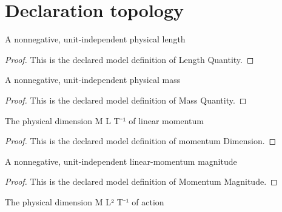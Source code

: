 \section{Declaration topology}
\begin{definition}
  \label{def:physics:phyx-mini-0557:phyxminiproblems-problemphyxmini0557-lengthquantity}
  A nonnegative, unit-independent physical length
\end{definition}
\begin{proof}
  This is the declared model definition of Length Quantity.
\end{proof}
\begin{definition}
  \label{def:physics:phyx-mini-0557:phyxminiproblems-problemphyxmini0557-massquantity}
  A nonnegative, unit-independent physical mass
\end{definition}
\begin{proof}
  This is the declared model definition of Mass Quantity.
\end{proof}
\begin{definition}
  \label{def:physics:phyx-mini-0557:phyxminiproblems-problemphyxmini0557-momentumdimension}
  The physical dimension M L T⁻¹ of linear momentum
\end{definition}
\begin{proof}
  This is the declared model definition of momentum Dimension.
\end{proof}
\begin{definition}
  \label{def:physics:phyx-mini-0557:phyxminiproblems-problemphyxmini0557-momentummagnitude}
  A nonnegative, unit-independent linear-momentum magnitude
\end{definition}
\begin{proof}
  This is the declared model definition of Momentum Magnitude.
\end{proof}
\begin{definition}
  \label{def:physics:phyx-mini-0557:phyxminiproblems-problemphyxmini0557-actiondimension}
  The physical dimension M L² T⁻¹ of action
\end{definition}
